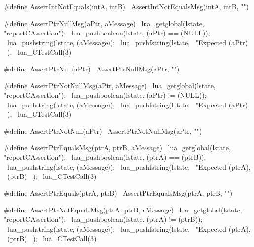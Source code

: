 #define AssertIntNotEquals(intA, intB) \
  AssertIntNotEqualsMsg(intA, intB, "")
\stopCHeader

\stopTestSuite

\startTestSuite[assertPrtNull]

\startCHeader
#define AssertPtrNullMsg(aPtr, aMessage)     \
  lua_getglobal(lstate, "reportCAssertion"); \
  lua_pushboolean(lstate, (aPtr) == (NULL)); \
  lua_pushstring(lstate, (aMessage));        \
  lua_pushfstring(lstate,                    \
      "Expected %
      (aPtr)                                 \
    );                                       \
  lua_CTestCall(3)

#define AssertPtrNull(aPtr) \
  AssertPtrNullMsg(aPtr, "")
\stopCHeader

\stopTestSuite

\startTestSuite[assertPtrNotNull]

\startCHeader
#define AssertPtrNotNullMsg(aPtr, aMessage)  \
  lua_getglobal(lstate, "reportCAssertion"); \
  lua_pushboolean(lstate, (aPtr) != (NULL)); \
  lua_pushstring(lstate, (aMessage));        \
  lua_pushfstring(lstate,                    \
      "Expected %
      (aPtr)                                 \
    );                                       \
  lua_CTestCall(3)

#define AssertPtrNotNull(aPtr) \
  AssertPtrNotNullMsg(aPtr, "")
\stopCHeader

\stopTestSuite

\startTestSuite[assertPtrEquals]

\startCHeader
#define AssertPtrEqualsMsg(ptrA, ptrB, aMessage) \
  lua_getglobal(lstate, "reportCAssertion");     \
  lua_pushboolean(lstate, (ptrA) == (ptrB));     \
  lua_pushstring(lstate, (aMessage));            \
  lua_pushfstring(lstate,                        \
      "Expected %
      (ptrA),                                    \
      (ptrB)                                     \
    );                                           \
  lua_CTestCall(3)

#define AssertPtrEquals(ptrA, ptrB) \
  AssertPtrEqualsMsg(ptrA, ptrB, "")
\stopCHeader

\stopTestSuite

\startTestSuite[assertPtrNotEquals]

\startCHeader
#define AssertPtrNotEqualsMsg(ptrA, ptrB, aMessage) \
  lua_getglobal(lstate, "reportCAssertion");        \
  lua_pushboolean(lstate, (ptrA) != (ptrB));        \
  lua_pushstring(lstate, (aMessage));               \
  lua_pushfstring(lstate,                           \
      "Expected %
      (ptrA),                                       \
      (ptrB)                                        \
    );                                              \
  lua_CTestCall(3)

